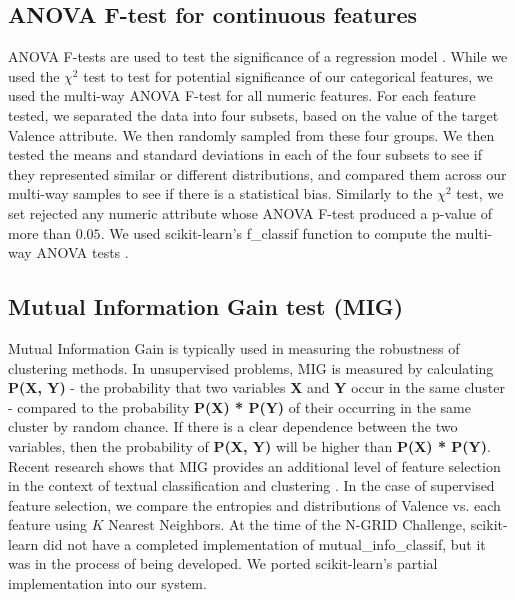 \subsection{ANOVA F-test for continuous features} 
ANOVA F-tests are used to test the significance of a regression model \cite{anova}.
While we used the $\chi^2$ test to test for potential significance of our 
categorical features, we used the multi-way ANOVA F-test for all numeric features.
For each feature tested, we separated the data into four subsets, based on the 
value of the target {Valence} attribute. We then randomly sampled from these four groups. We then tested the means and standard
deviations in each of the four subsets to see if they represented similar or
different distributions, and compared them across our multi-way samples to see if there is a statistical bias. Similarly to the $\chi^2$ test, we set rejected any numeric attribute whose ANOVA F-test
produced a p-value of more than $0.05$. We used
scikit-learn's \textsf{f\_classif} function to 
compute the multi-way ANOVA tests \cite{scikit-learn}. 

\subsection{Mutual Information Gain test (MIG)}

Mutual Information Gain is typically used in measuring the robustness of clustering methods.
In unsupervised problems, MIG  is measured by calculating \textbf{P(X, Y)} - the probability that two variables \textbf{X} and \textbf{Y} occur in the same cluster - compared to the probability \textbf{P(X) * P(Y)} of their occurring in the same cluster by random chance. If there is a clear dependence  %
between the two variables, then the probability of \textbf{P(X, Y)} will be higher %
than \textbf{P(X) * P(Y)}. Recent research shows that MIG provides an additional level of feature selection in the context of textual classification and clustering \cite{Xu07}. In the case of supervised feature selection, we compare the entropies and distributions of \textsf{Valence} vs. each feature
using $K$ Nearest Neighbors. At the time of the N-GRID Challenge, \textsf{scikit-learn} \cite{scikit-learn}
did not have a completed implementation of
\textsf{mutual\_info\_classif}, but it was in the process of being developed. We ported \textsf{scikit-learn}'s partial implementation into our system.

